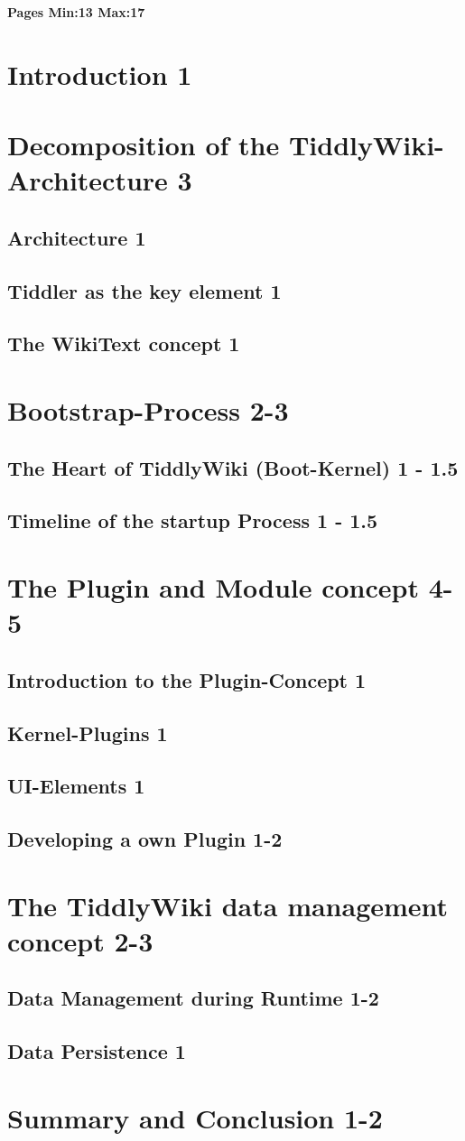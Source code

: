 \documentclass[12pt,a4paper]{article}
\begin{document}
\tableofcontents
\textbf{Pages Min:13 Max:17 }
\section{Introduction 1}
\section{Decomposition of the TiddlyWiki-Architecture 3}
\subsection{Architecture 1}
\subsection{Tiddler as the key element 1}
\subsection{The WikiText concept 1}
\section{Bootstrap-Process 2-3}
\subsection{The Heart of TiddlyWiki (Boot-Kernel) 1 - 1.5}
\subsection{Timeline of the startup Process 1 - 1.5}
\section{The Plugin and Module concept 4-5}
\subsection{Introduction to the Plugin-Concept 1}
\subsection{Kernel-Plugins 1}
\subsection{UI-Elements 1}
\subsection{Developing a own Plugin 1-2}
\section{The TiddlyWiki data management concept 2-3}
\subsection{Data Management during Runtime 1-2}
\subsection{Data Persistence 1}
\section{Summary and Conclusion 1-2}
\end{document}
